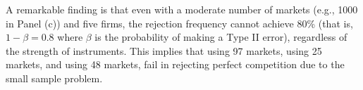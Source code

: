 \documentclass[11pt, a4paper]{article}
\begin{document}
A remarkable finding is that even with a moderate number of markets (e.g., 1000 in Panel (c)) and five firms, the rejection frequency cannot achieve 80\% (that is, $1-\beta=0.8$ where $\beta$ is the probability of making a Type II error), regardless of the strength of instruments.
This implies that \cite{genesove1998testing} using 97 markets, \cite{shaffer1993test} using 25 markets, and \cite{steen1999testing} using 48 markets, fail in rejecting perfect competition due to the small sample problem.


\begin{figure}[!ht]
  \begin{center}
  \\

\end{center}
\end{figure}
\end{document}
